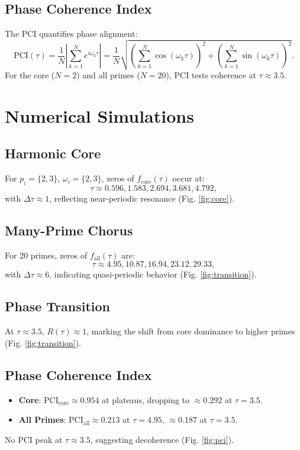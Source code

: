 \documentclass[11pt]{article}
\theoremstyle{definition}
\begin{document}
\subsection{Phase Coherence Index}
The PCI quantifies phase alignment:
\begin{equation}
\text{PCI}(\tau) = \frac{1}{N} \left| \sum_{k=1}^N e^{i \omega_k \tau} \right| = \frac{1}{N} \sqrt{\left( \sum_{k=1}^N \cos(\omega_k \tau) \right)^2 + \left( \sum_{k=1}^N \sin(\omega_k \tau) \right)^2}.
\end{equation}
For the core (\( N = 2 \)) and all primes (\( N = 20 \)), PCI tests coherence at \( \tau \approx 3.5 \).

\section{Numerical Simulations}
\subsection{Harmonic Core}
For \( p_i = \{2, 3\} \), \( \omega_i = \{2, 3\} \), zeros of \( f_{\text{core}}(\tau) \) occur at:
\[
\tau \approx 0.596, 1.583, 2.694, 3.681, 4.792,
\]
with \( \Delta \tau \approx 1 \), reflecting near-periodic resonance (Fig. \ref{fig:core}).

\subsection{Many-Prime Chorus}
For 20 primes, zeros of \( f_{\text{all}}(\tau) \) are:
\[
\tau \approx 4.95, 10.87, 16.94, 23.12, 29.33,
\]
with \( \Delta \tau \approx 6 \), indicating quasi-periodic behavior (Fig. \ref{fig:transition}).

\subsection{Phase Transition}
At \( \tau \approx 3.5 \), \( R(\tau) \approx 1 \), marking the shift from core dominance to higher primes (Fig. \ref{fig:transition}).

\subsection{Phase Coherence Index}
\begin{itemize}
    \item \textbf{Core}: \( \text{PCI}_{\text{core}} \approx 0.954 \) at plateaus, dropping to \( \approx 0.292 \) at \( \tau = 3.5 \).
    \item \textbf{All Primes}: \( \text{PCI}_{\text{all}} \approx 0.213 \) at \( \tau = 4.95 \), \( \approx 0.187 \) at \( \tau = 3.5 \).
\end{itemize}
No PCI peak at \( \tau \approx 3.5 \), suggesting decoherence (Fig. \ref{fig:pci}).
\end{document}
